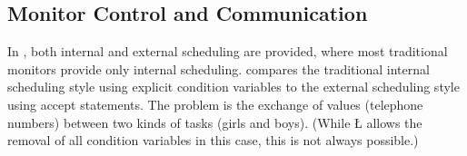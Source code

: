 \documentclass[openright,twoside]{report}
\begin{document}
\subsection{Monitor Control and Communication}

In \uC, both internal and external scheduling are provided, where most traditional monitors provide only internal scheduling.
 compares the traditional internal scheduling style using explicit condition variables to the external scheduling style using accept statements.
The problem is the exchange of values (telephone numbers) between two kinds of tasks (girls and boys).
(While \LGinlinetrue\LGbegin\lgrinde\L{}\endlgrinde\LGend{} allows the removal of all condition variables in this case, this is not always possible.)
\end{document}
